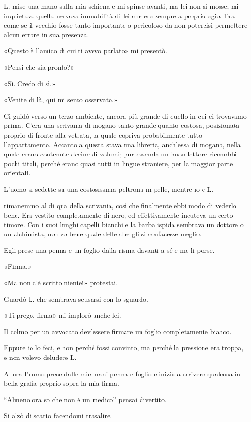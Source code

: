 \documentclass[a4paper,12pt]{book}
\begin{document}
L. mise una mano sulla mia schiena e mi spinse avanti, ma lei non si mosse; mi
inquietava quella nervosa immobilità di lei che era sempre a proprio agio. Era
come se il vecchio fosse tanto importante o pericoloso da non potercisi
permettere alcun errore in sua presenza.

«Questo è l’amico di cui ti avevo parlato» mi presentò.

«Pensi che sia pronto?»

«Sì. Credo di sì.»

«Venite di là, qui mi sento osservato.»

Ci guidò verso un terzo ambiente, ancora più grande di quello in cui ci
trovavamo prima. C’era una scrivania di mogano tanto grande quanto costosa,
posizionata proprio di fronte alla vetrata, la quale copriva probabilmente tutto
l’appartamento. Accanto a questa stava una libreria, anch’essa di mogano,
nella quale erano contenute decine di volumi; pur essendo un buon lettore
riconobbi pochi titoli, perché erano quasi tutti in lingue straniere, per la
maggior parte orientali.

L’uomo si sedette su una costosissima poltrona in pelle, mentre io e L.

rimanemmo al di qua della scrivania, così che finalmente ebbi modo di vederlo
bene. Era vestito completamente di nero, ed effettivamente incuteva un certo
timore. Con i suoi lunghi capelli bianchi e la barba ispida sembrava un dottore
o un alchimista, non so bene quale delle due gli si confacesse meglio.

Egli prese una penna e un foglio dalla risma davanti a sé e me li porse.

«Firma.»

«Ma non c’è scritto niente!» protestai.

Guardò L. che sembrava scusarsi con lo sguardo.

«Ti prego, firma» mi implorò anche lei.

Il colmo per un avvocato dev’essere firmare un foglio completamente bianco.

Eppure io lo feci, e non perché fossi convinto, ma perché la pressione era
troppa, e non volevo deludere L.

Allora l’uomo prese dalle mie mani penna e foglio e iniziò a scrivere
qualcosa in bella grafia proprio sopra la mia firma.

``Almeno ora so che non è un medico'' pensai divertito.

Si alzò di scatto facendomi trasalire.
\end{document}
